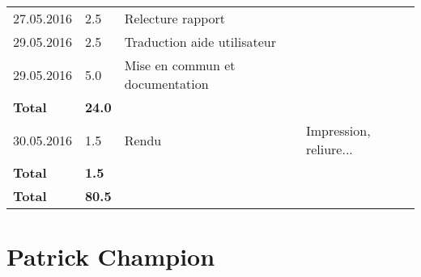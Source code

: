 \documentclass[french]{article}
\begin{document}
\begin{longtable}{p{}|p{}|p{}|p{}}
		27.05.2016 & 2.5 & Relecture rapport & \\
		29.05.2016 & 2.5 & Traduction aide utilisateur & \\
		29.05.2016 & 5.0 & Mise en commun et documentation & \\
		\textbf{Total} & \textbf{24.0} &&\\
		\hline
		30.05.2016 & 1.5 & Rendu & Impression, reliure... \\
		\textbf{Total} & \textbf{1.5} &&\\
		\hline
		\hline
		\textbf{Total} & \textbf{80.5} &&\\	
	\end{longtable}
	
	\section*{Patrick Champion}
\end{document}
